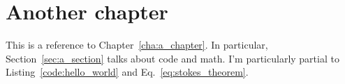 \chapter{Another chapter}
\label{cha:another_chapter}

This is a reference to Chapter~\ref{cha:a_chapter}. In particular, Section~\ref{sec:a_section} talks about code and math. I'm particularly partial to Listing~\ref{code:hello_world} and Eq.~\eqref{eq:stokes_theorem}.
